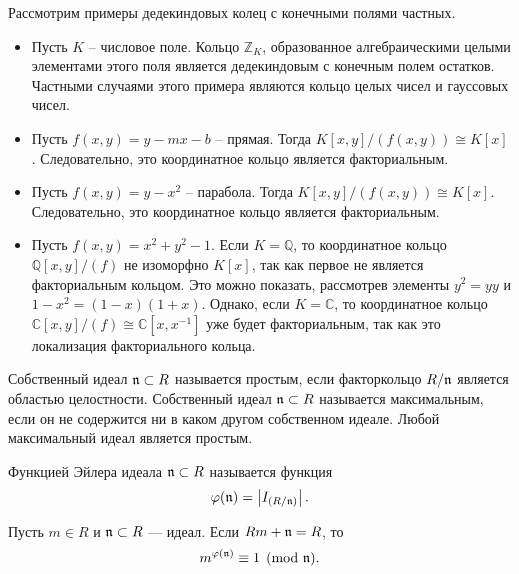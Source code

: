\documentclass[_00_dissertation.tex]{subfiles}
\begin{document}
\begin{example}
    Рассмотрим примеры дедекиндовых колец с конечными полями частных.
    \begin{itemize}
        \item Пусть $K$ -- числовое поле.
        Кольцо $\mathbb{Z}_K$, образованное алгебраическими целыми элементами этого поля является дедекиндовым с конечным полем остатков.
        Частными случаями этого примера являются кольцо целых чисел и гауссовых чисел.
        
        \item Пусть $f(x, y) = y - mx - b$ -- прямая.
        Тогда $K[x, y]/(f(x, y)) \cong K[x]$.
        Следовательно, это координатное кольцо является факториальным.
        
        \item Пусть $f(x, y) = y - x^2$ -- парабола.
        Тогда $K[x, y]/(f(x, y)) \cong K[x]$.
        Следовательно, это координатное кольцо является факториальным.
    
        \item Пусть $f(x, y) = x^2 + y^2 - 1$.
        Если $K = \mathbb{Q}$, то координатное кольцо $\mathbb{Q}[x, y]/(f)$ не изоморфно $K[x]$, так как первое не является факториальным кольцом.
        Это можно показать, рассмотрев элементы $y^2 = yy$ и $1-x^2 = (1-x)(1+x)$.
        Однако, если $K = \mathbb{C}$, то координатное кольцо $\mathbb{C}[x, y]/(f) \cong \mathbb{C}[x, x^{-1}]$ уже будет факториальным, так как это локализация факториального кольца.
    \end{itemize}
\end{example}

Собственный идеал $\mathfrak{n} \subset R$ называется простым, если факторкольцо $R/\mathfrak{n}$ является областью целостности.
Собственный идеал $\mathfrak{n} \subset R$ называется максимальным, если он не содержится ни в каком другом собственном идеале.
Любой максимальный идеал является простым.

\begin{definition}\cite{source:Petukhova}
    Функцией Эйлера идеала $\mathfrak{n} \subset R$ называется функция
    \begin{equation*}
        \varphi(\mathfrak{n}) = \left|
            I_{(R/\mathfrak{n})}
        \right|.
    \end{equation*}
\end{definition}

\begin{statement}\cite{source:Petukhova}
    Пусть $m \in R$ и $\mathfrak{n} \subset R$ --- идеал.
    Если $Rm + \mathfrak{n} = R$, то
    \begin{equation*}
        m^{\varphi(\mathfrak{n})}\equiv 1 \pmod{\mathfrak{n}}.
    \end{equation*}
\end{statement}
\end{document}
